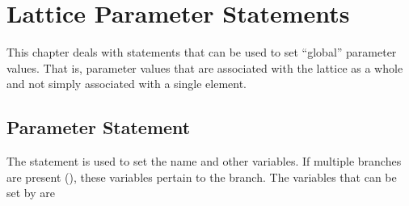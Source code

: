 \chapter{Lattice Parameter Statements}

This chapter deals with statements that can be used to set ``global''
parameter values. That is, parameter values that are associated with
the lattice as a whole and not simply associated with a single element.

\section{Parameter Statement}
\label{s:param}


The  statement is used to set the  name and
other variables. If multiple branches are present (), these
variables pertain to the  branch. The variables that can be
set by  are
